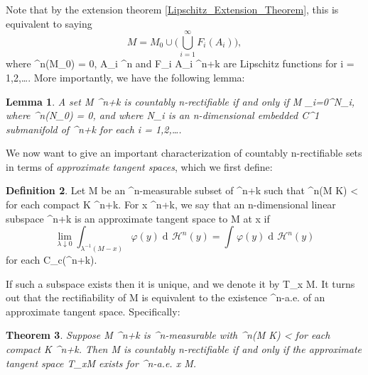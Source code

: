 \documentclass[a4paper, 11pt]{article}
\theoremstyle{plain}
\newtheorem{theorem}{Theorem}[section]
\newtheorem{lemma}[theorem]{Lemma}
\theoremstyle{definition}
\newtheorem{definition}[theorem]{Definition}
\theoremstyle{remark}
\DeclareMathOperator{\diff}{d \!}
\numberwithin{equation}{subsection}
\def\({}
\def\){}
\def\pi{}
\begin{document}
Note that by the extension theorem \ref{Lipschitz_Extension_Theorem}, this is equivalent to saying
\begin{equation}
M = M_0 \cup \bigg(\bigcup_{i=1}^{\infty}F_i(A_i)\bigg),
\end{equation}
where \(^{n}(M_0) = 0\), \(A_i \subset {}^{n}\) and \(F_i \vcentcolon A_i \rightarrow {}^{n+k}\) are Lipschitz functions for \(i = 1,2,\ldots\). More importantly, we have the following lemma:

\begin{lemma}
\label{Rectifiable_iff_submanifoldCover}
A set \(M \subset {}^{n+k}\) is countably \(n\)-rectifiable if and only if \(M \subset \bigcup_{i=0}^{\infty}N_i\), where \(^{n}(N_0) = 0\), and where \(N_i\) is an \(n\)-dimensional embedded \(C^1\) submanifold of \(^{n+k}\) for each \(i = 1,2,\ldots\).
\end{lemma}

We now want to give an important characterization of countably \(n\)-rectifiable sets in terms of \emph{approximate tangent spaces}, which we first define:

\begin{definition}
Let \(M\) be an \(^n\)-measurable subset of \(^{n+k}\) such that \(^{n}(M \cap K) < \infty\) for each compact \(K \subset {}^{n+k}\). For \(x \in {}^{n+k}\), we say that an \(n\)-dimensional linear subspace \(\pi \subset {}^{n+k}\) is an approximate tangent space to \(M\) at \(x\) if
\begin{equation}
\lim_{\lambda \downarrow 0} \int_{\lambda^{-1}(M-x)}\varphi(y) \diff \mathcal{H}^{n}(y) = \int_{\pi}\varphi(y)\diff \mathcal{H}^{n}(y)
\end{equation}
for each \(\varphi \in C_{c}(^{n+k})\).
\end{definition}
If such a subspace exists then it is unique, and we denote it by \(T_x M\). It turns out that the rectifiability of \(M\) is equivalent to the existence \(^{n}\)-a.e. of an approximate tangent space. Specifically:

\begin{theorem}
Suppose \(M \subset {}^{n+k}\) is \(^{n}\)-measurable with \(^{n}(M \cap K) < \infty\) for each compact \(K \subset {}^{n+k}\). Then \(M\) is countably \(n\)-rectifiable if and only if the approximate tangent space \(T_{x}M\) exists for \(^{n}\)-a.e. \(x \in M\). 
\end{theorem}
\end{document}
